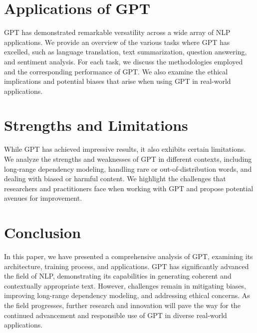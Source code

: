 \documentclass[a4paper,10pt,twocolumn]{article}
\begin{document}
\section{Applications of GPT}
GPT has demonstrated remarkable versatility across a wide array of NLP applications. We provide an overview of the various tasks where GPT has excelled, such as language translation, text summarization, question answering, and sentiment analysis. For each task, we discuss the methodologies employed and the corresponding performance of GPT. We also examine the ethical implications and potential biases that arise when using GPT in real-world applications.

\section{Strengths and Limitations}
While GPT has achieved impressive results, it also exhibits certain limitations. We analyze the strengths and weaknesses of GPT in different contexts, including long-range dependency modeling, handling rare or out-of-distribution words, and dealing with biased or harmful content. We highlight the challenges that researchers and practitioners face when working with GPT and propose potential avenues for improvement.

\section{Conclusion}
In this paper, we have presented a comprehensive analysis of GPT, examining its architecture, training process, and applications. GPT has significantly advanced the field of NLP, demonstrating its capabilities in generating coherent and contextually appropriate text. However, challenges remain in mitigating biases, improving long-range dependency modeling, and addressing ethical concerns. As the field progresses, further research and innovation will pave the way for the continued advancement and responsible use of GPT in diverse real-world applications.
\end{document}
